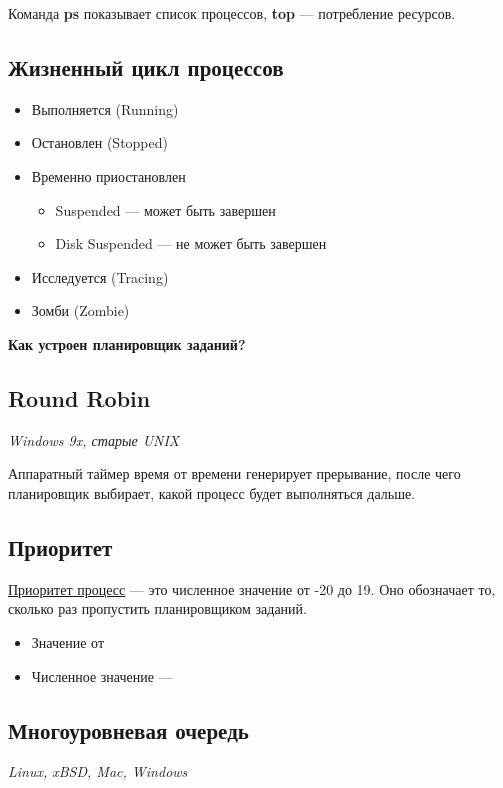 Команда \textbf{ps} показывает список процессов, \textbf{top} --- потребление ресурсов.

\subsection{Жизненный цикл процессов}

\begin{itemize}
	\item Выполняется (Running)
	\item Остановлен (Stopped)
	\item Временно приостановлен
		\begin{itemize}
			\item Suspended --- может быть завершен
			\item Disk Suspended --- не может быть завершен
		\end{itemize}
	\item Исследуется (Tracing)
	\item Зомби (Zombie)
\end{itemize}

\textbf{Как устроен планировщик заданий?}

\subsection{Round Robin}
\textit{Windows 9x, старые UNIX}

Аппаратный таймер время от времени генерирует прерывание, после чего планировщик
выбирает, какой процесс будет выполняться дальше.

\subsection{Приоритет}

\begin{Def}
	\underline{Приоритет процесс} --- это численное значение от -20 до 19. 
	Оно обозначает то, сколько раз пропустить планировщиком заданий.
\end{Def}

\begin{itemize}
	\item Значение от 
	\item Численное значение --- 
\end{itemize}

\subsection{Многоуровневая очередь}
\textit{Linux, xBSD, Mac, Windows}

